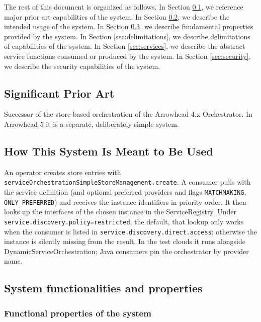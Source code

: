 \documentclass[a4paper]{arrowhead}
\begin{document}
The rest of this document is organized as follows.
In Section \ref{sec:prior_art}, we reference major prior art capabilities of the system.
In Section \ref{sec:use}, we describe the intended usage of the system.
In Section \ref{sec:properties}, we describe fundamental properties provided by the system.
In Section \ref{sec:delimitations}, we describe delimitations of capabilities of the system.
In Section \ref{sec:services}, we describe the abstract service functions consumed or produced by the system.
In Section \ref{sec:security}, we describe the security capabilities of the system.

\newpage

\subsection{Significant Prior Art}
\label{sec:prior_art}

Successor of the store-based orchestration of the Arrowhead 4.x Orchestrator. In Arrowhead 5 it is a separate, deliberately simple system.

\subsection{How This System Is Meant to Be Used}
\label{sec:use}

An operator creates store entries with \texttt{service\allowbreak{}Orchestration\allowbreak{}Simple\allowbreak{}Store\allowbreak{}Management.\allowbreak{}create}. A consumer pulls with the service definition (and optional preferred providers and flags \texttt{MATCHMAKING}, \texttt{ONLY\_\allowbreak{}PREFERRED}) and receives the instance identifiers in priority order. It then looks up the interfaces of the chosen instance in the ServiceRegistry. Under \texttt{service.\allowbreak{}discovery.\allowbreak{}policy=\allowbreak{}restricted}, the default, that lookup only works when the consumer is listed in \texttt{service.\allowbreak{}discovery.\allowbreak{}direct.\allowbreak{}access}; otherwise the instance is silently missing from the result. In the test clouds it runs alongside Dynamic\allowbreak{}Service\allowbreak{}Orchestration; Java consumers pin the orchestrator by provider name.

\subsection{System functionalities and properties}
\label{sec:properties}

\subsubsection{Functional properties of the system}
\end{document}
